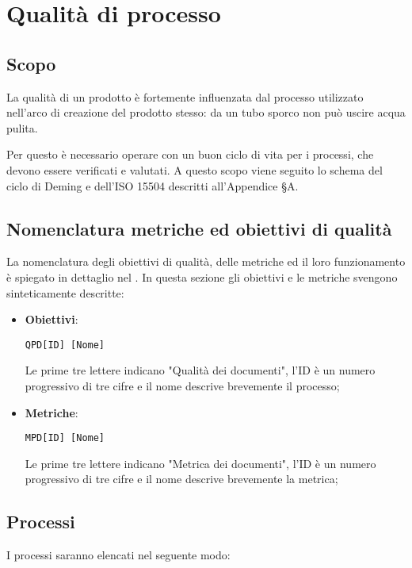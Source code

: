 \section{Qualità di processo}\label{QualitaProcesso}

\subsection{Scopo}
La qualità di un prodotto è fortemente influenzata dal processo utilizzato nell'arco di creazione del prodotto stesso: da un tubo sporco non può uscire acqua pulita.

Per questo è necessario operare con un buon ciclo di vita per i processi, che devono essere verificati e valutati. A questo scopo viene seguito lo schema del ciclo di Deming e dell'ISO 15504 descritti all'Appendice §A.

\subsection{Nomenclatura metriche ed obiettivi di qualità}
La nomenclatura degli obiettivi di qualità, delle metriche ed il loro funzionamento è spiegato in dettaglio nel \Doc{\NdPv}. In questa sezione gli obiettivi e le metriche svengono sinteticamente descritte:

\begin{itemize}
	\item \textbf{Obiettivi}: 
	
	\begin{center}
	\texttt{QPD[ID] [Nome]}
	\end{center} 

	Le prime tre lettere indicano "Qualità dei documenti", l'ID è un numero progressivo di tre cifre e il nome descrive brevemente il processo;
	\item \textbf{Metriche}:
	
	\begin{center}
		\texttt{MPD[ID] [Nome]}
	\end{center}
	
	Le prime tre lettere indicano "Metrica dei documenti", l'ID è un numero progressivo di tre cifre e il nome descrive brevemente la metrica;
\end{itemize}

\subsection{Processi}
I processi saranno elencati nel seguente modo:

